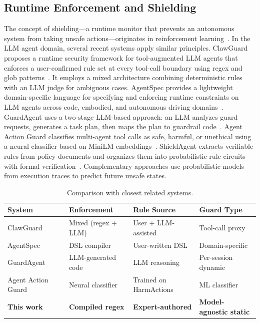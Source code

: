\documentclass[journal]{IEEEtran}
\begin{document}
\subsection{Runtime Enforcement and Shielding}

The concept of shielding---a runtime monitor that prevents an autonomous system from taking unsafe actions---originates in reinforcement learning~\cite{alshiekh2018safe}. In the LLM agent domain, several recent systems apply similar principles. ClawGuard proposes a runtime security framework for tool-augmented LLM agents that enforces a user-confirmed rule set at every tool-call boundary using regex and glob patterns~\cite{clawguard2026}. It employs a mixed architecture combining deterministic rules with an LLM judge for ambiguous cases. AgentSpec provides a lightweight domain-specific language for specifying and enforcing runtime constraints on LLM agents across code, embodied, and autonomous driving domains~\cite{agentspec2026}. GuardAgent uses a two-stage LLM-based approach: an LLM analyzes guard requests, generates a task plan, then maps the plan to guardrail code~\cite{guardagent2024}. Agent Action Guard classifies multi-agent tool calls as safe, harmful, or unethical using a neural classifier based on MiniLM embeddings~\cite{agentActionGuard2025}. ShieldAgent extracts verifiable rules from policy documents and organizes them into probabilistic rule circuits with formal verification~\cite{shieldagent2025}. Complementary approaches use probabilistic models from execution traces to predict future unsafe states.

\begin{table}[t]
\centering
\caption{Comparison with closest related systems.}
\label{tab:comparison}
\setlength{\tabcolsep}{4pt}
\begin{tabular}{p{2.2cm}p{1.5cm}p{1.5cm}p{1.8cm}}
\toprule
System & Enforcement & Rule Source & Guard Type \\
\midrule
ClawGuard~\cite{clawguard2026} & Mixed (regex + LLM) & User + LLM-assisted & Tool-call proxy \\
AgentSpec~\cite{agentspec2026} & DSL compiler & User-written DSL & Domain-specific \\
GuardAgent~\cite{guardagent2024} & LLM-generated code & LLM reasoning & Per-session dynamic \\
Agent Action Guard~\cite{agentActionGuard2025} & Neural classifier & Trained on HarmActions & ML classifier \\
\textbf{This work} & \textbf{Compiled regex} & \textbf{Expert-authored} & \textbf{Model-agnostic static} \\
\bottomrule
\end{tabular}
\end{table}
\end{document}
